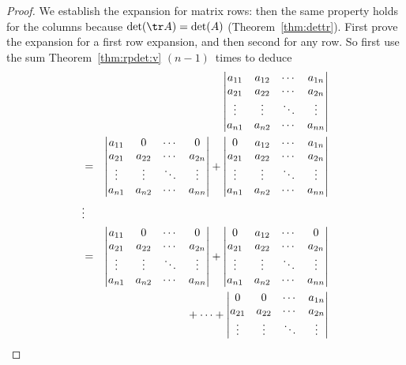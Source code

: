 \begin{proof} 
We establish the expansion for matrix rows: then the same property holds for the columns because \(\det(\tr A)=\det(A)\) (Theorem~\ref{thm:dettr}).
First prove the expansion for a first row expansion, and then second for any row.
So first use the sum Theorem~\ref{thm:rpdet:v} \((n-1)\)~times to deduce
\begin{eqnarray*}&&\hspace{-1em}
\begin{vmatrix} a_{11}&a_{12}&\cdots&a_{1n}
\\ a_{21}&a_{22}&\cdots&a_{2n}
\\ \vdots&\vdots&\ddots&\vdots
\\ a_{n1}&a_{n2}&\cdots&a_{nn}
\end{vmatrix}
\\&=&
\begin{vmatrix} a_{11}&0&\cdots&0
\\ a_{21}&a_{22}&\cdots&a_{2n}
\\ \vdots&\vdots&\ddots&\vdots
\\ a_{n1}&a_{n2}&\cdots&a_{nn}
\end{vmatrix}
+\begin{vmatrix} 0&a_{12}&\cdots&a_{1n}
\\ a_{21}&a_{22}&\cdots&a_{2n}
\\ \vdots&\vdots&\ddots&\vdots
\\ a_{n1}&a_{n2}&\cdots&a_{nn}
\end{vmatrix}
\\&\vdots&
\\&=&
\begin{vmatrix} a_{11}&0&\cdots&0
\\ a_{21}&a_{22}&\cdots&a_{2n}
\\ \vdots&\vdots&\ddots&\vdots
\\ a_{n1}&a_{n2}&\cdots&a_{nn}
\end{vmatrix}
+\begin{vmatrix} 0&a_{12}&\cdots&0
\\ a_{21}&a_{22}&\cdots&a_{2n}
\\ \vdots&\vdots&\ddots&\vdots
\\ a_{n1}&a_{n2}&\cdots&a_{nn}
\end{vmatrix}
\\&&{}
+\cdots
+\begin{vmatrix} 0&0&\cdots&a_{1n}
\\ a_{21}&a_{22}&\cdots&a_{2n}
\\ \vdots&\vdots&\ddots&\vdots

\end{vmatrix}
\end{eqnarray*}
\end{proof}
